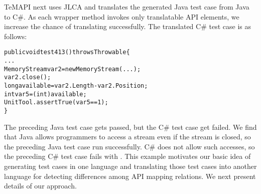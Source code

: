 TeMAPI next uses JLCA and translates the generated Java test case from Java to C\#. As each wrapper method invokes only translatable API elements, we increase the chance of translating successfully. The translated C\# test case is as follows:

\begin{CodeOut}\vspace*{-1ex}
\begin{alltt}
public void test413() throws Throwable\{
  ...
  MemoryStream var2 = new MemoryStream(...);
  var2.close();
  long available = var2.Length - var2.Position;
  int var5 = (int) available;
  UnitTool.assertTrue(var5 == 1);
\}
\end{alltt}
\end{CodeOut}\vspace*{-2ex}

The preceding Java test case gets passed, but the C\# test case get failed. We find that Java allows programmers to access a stream even if the stream is closed, so the preceding Java test case run successfully. C\# does not allow such accesses, so the preceding C\# test case fails with . This example motivates our basic idea of generating test cases in one language and translating those test cases into another language for detecting differences among API mapping relations. We next present details of our approach.



